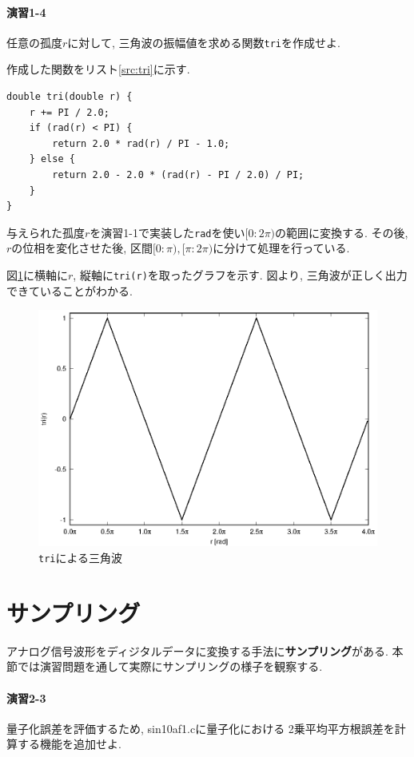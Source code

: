 \documentclass[titlepage]{jsarticle}
\begin{document}
    \paragraph{演習1-4} 任意の孤度$r$に対して, 三角波の振幅値を求める関数\verb|tri|を作成せよ.

        作成した関数をリスト\ref{src:tri}に示す.

        \begin{lstlisting}[caption=tri.c, label=src:tri]
double tri(double r) {
    r += PI / 2.0;
    if (rad(r) < PI) {
        return 2.0 * rad(r) / PI - 1.0;
    } else {
        return 2.0 - 2.0 * (rad(r) - PI / 2.0) / PI;
    }
}\end{lstlisting}

        与えられた孤度$r$を演習1-1で実装した\verb|rad|を使い$[0:2\pi)$の範囲に変換する.
        その後, $r$の位相を変化させた後, 区間$[0:\pi), [\pi:2\pi)$に分けて処理を行っている.

        図\ref{fig:tri}に横軸に$r$, 縦軸に\verb|tri(r)|を取ったグラフを示す.
        図より, 三角波が正しく出力できていることがわかる.

        \begin{figure}[h]
            \centering
            \includegraphics[width=0.8\hsize]{images/tri.eps}
            \cprotect\caption{\verb|tri|による三角波}
            \label{fig:tri}
        \end{figure}

\section{サンプリング}
    アナログ信号波形をディジタルデータに変換する手法に\textbf{サンプリング}がある.
    本節では演習問題を通して実際にサンプリングの様子を観察する.

    \paragraph{演習2-3} 量子化誤差を評価するため, sin10af1.cに量子化における
    2乗平均平方根誤差を計算する機能を追加せよ.
\end{document}
